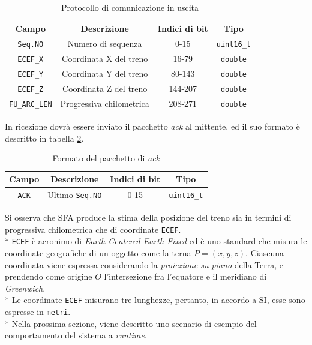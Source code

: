 \begin{table}[h]
	\centering
	\begin{tabular}{|c|c|c|c|}
		\hline 
		\textbf{Campo} & \textbf{Descrizione} & \textbf{Indici di bit} & \textbf{Tipo} \\ 
		\hline
		\texttt{Seq.NO} & Numero di sequenza & 0-15 & \texttt{uint16\_t} \\ 
		\hline 
		\texttt{ECEF\_X} & Coordinata X del treno & 16-79 & \texttt{double} \\ 
		\hline 
		\texttt{ECEF\_Y} & Coordinata Y del treno & 80-143 & \texttt{double} \\ 
		\hline 
		\texttt{ECEF\_Z} & Coordinata Z del treno & 144-207 & \texttt{double} \\ 
		\hline 
		\texttt{FU\_ARC\_LEN} & Progressiva chilometrica & 208-271 & \texttt{double} \\ 
		\hline 
	\end{tabular} 
\caption{Protocollo di comunicazione in uscita}
\label{tab:protoout}
\end{table}
In ricezione dovr\`a essere inviato il pacchetto \emph{ack} al mittente, ed il suo formato \`e descritto in tabella \ref{tab:ack}.
\begin{table}[h]
	\centering
	\begin{tabular}{|c|c|c|c|}
	\hline 
	\textbf{Campo} & \textbf{Descrizione} & \textbf{Indici di bit} & \textbf{Tipo} \\ 
	\hline
	\texttt{ACK} & Ultimo \texttt{Seq.NO} & 0-15 & \texttt{uint16\_t} \\ 
	\hline
\end{tabular}
\caption{Formato del pacchetto di \emph{ack}}
\label{tab:ack}
\end{table}
Si osserva che SFA produce la stima della posizione del treno sia in termini di progressiva chilometrica che di coordinate \texttt{ECEF}.\\*
\texttt{ECEF} \`e acronimo di \emph{Earth Centered Earth Fixed} ed \`e uno standard che misura le coordinate geografiche di un oggetto come la terna $ P = (x,y,z)$. Ciascuna coordinata viene espressa considerando la \emph{proiezione su piano} della Terra, e prendendo come origine $O$ l'intersezione fra l'equatore e il meridiano di \emph{Greenwich}.\\*
Le coordinate \texttt{ECEF} misurano tre lunghezze, pertanto, in accordo a SI, esse sono espresse in \texttt{metri}.\\*
Nella prossima sezione, viene descritto uno scenario di esempio del comportamento del sistema a \emph{runtime}.
